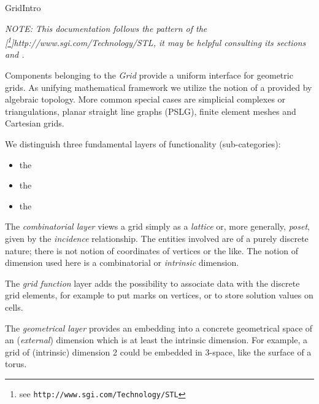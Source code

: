 
\begin{Label}{GridIntro}
\end{Label} 

{\em 
  NOTE: This documentation follows the pattern of the 
  [\footnote{see {\tt http://www.sgi.com/Technology/STL}}]{http://www.sgi.com/Technology/STL},
  it may be helpful consulting its sections
  and
  .
}
      
  Components belonging to the 
  {\em Grid\/} provide a uniform 
  interface for geometric grids. 
  As unifying mathematical framework
  we utilize the notion of a
  provided by algebraic topology. 
  More common special cases are
  simplicial complexes or triangulations,
  planar straight line graphs (PSLG),
  finite element meshes and Cartesian grids.
  
  We distinguish three fundamental layers of functionality (sub-categories):
  \begin{itemize}
  \item  the 
  \item the 
  \item the  
  \end{itemize}
  
  The {\em combinatorial layer\/} views a grid 
  simply as a {\em lattice\/} or, more generally, {\em poset},
  given by the {\em incidence\/} relationship.
  The entities involved are of  a purely discrete nature;
  there is not notion of coordinates of vertices or the like.
  The notion of dimension used here is a combinatorial or {\em intrinsic\/}
  dimension.
  
  The {\em grid function\/} layer adds the possibility to associate data 
  with the discrete grid elements, 
  for example to put marks on vertices,
  or to store solution values on cells.
  
  
  The {\em geometrical layer\/} provides an embedding into a concrete geometrical space of 
  an ({\em external\/}) dimension which is at least the intrinsic dimension. 
  For example, a grid of (intrinsic) dimension 2 could be embedded in 3-space,
  like the surface of a torus.
  

